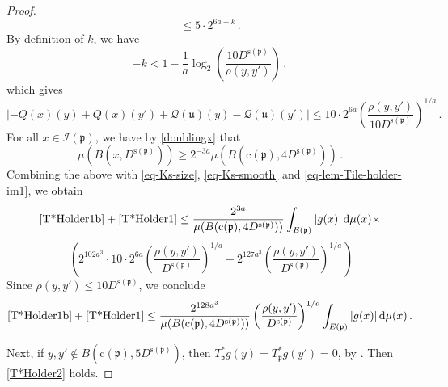 \documentclass[10pt,a4paper]{article}
\theoremstyle{plain}
\theoremstyle{definition}
\numberwithin{equation}{subsection}
\newcommand{\fp}{{\mathfrak p}}
\newcommand{\fu}{{\mathfrak u}}
\newcommand{\pc}{{\mathrm{c}}}
\newcommand{\ps}{{\mathrm{s}}}
\newcommand{\scI}{{\mathcal{I}}} %
\newcommand{\tQ}{{Q}}
\newcommand{\fcc}{{\mathcal{Q}}}
\begin{document}
\begin{proof}
        $$
            \le 5 \cdot 2^{6a - k}\,.
        $$
        By definition of $k$, we have
        $$
            -k < 1 - \frac{1}{a} \log_2\left(\frac{10 D^{\ps(\fp)}}{\rho(y,y')}\right)\,,
        $$
        which gives
      \begin{equation}
            \label{eq-lem-Tile-holder-im1}
             |-\tQ(x)(y) + \tQ(x)(y') + \fcc(\fu)(y) - \fcc(\fu)(y')| \le 10 \cdot 2^{6a} \left(\frac{\rho(y,y')}{10 D^{\ps(\fp)}}\right)^{1/a}\,.
        \end{equation}
        For all $x \in \scI(\fp)$, we have by \eqref{doublingx} that
        $$
            \mu(B(x, D^{\ps(\fp)})) \ge 2^{-3a} \mu(B(\pc(\fp), 4D^{\ps(\fp)}))\,.
        $$
        Combining the above with \eqref{eq-Ks-size}, \eqref{eq-Ks-smooth} and \eqref{eq-lem-Tile-holder-im1},
        we obtain
        $$
            \eqref{T*Holder1b}+\eqref{T*Holder1} \le \frac{2^{3a}}{\mu(B(\pc(\fp), 4D^{\ps(\fp)}))} \int_{E(\fp)}|g(x)| \, \mathrm{d}\mu(x) \times
        $$
        $$
            (2^{102a^3} \cdot 10 \cdot 2^{6a} \left(\frac{\rho(y,y')}{ D^{\ps(\fp)}}\right)^{1/a} + 2^{127a^3} \left(\frac{\rho(y,y')}{D^{\ps(\fp)}}\right)^{1/a})
        $$
        Since $\rho(y,y') \le 10 D^{\ps(\fp)}$, we conclude
        $$
            \eqref{T*Holder1b}+\eqref{T*Holder1} \le \frac{2^{128a^3}}{\mu(B(\pc(\fp), 4D^{\ps(\fp)}))} \left(\frac{\rho(y,y')}{D^{\ps(\fp)}}\right)^{1/a} \int_{E(\fp)}|g(x)| \, \mathrm{d}\mu(x)\,.
        $$

        Next, if $y,y' \notin B(\pc(\fp), 5D^{\ps(\fp)})$, then $T_{\fp}^*g(y) = T_{\fp}^*g(y') = 0$, by . Then \eqref{T*Holder2} holds.


\end{proof}
\end{document}
